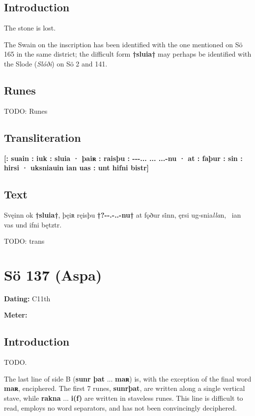\subsection{Introduction}

The stone is lost.

The Swain on the inscription has been identified with the one mentioned on Sö 165 in the same district; the difficult form \textbf{†sluia†} may perhaps be identified with the Slode (\emph{Slóði}) on Sö 2 and 141.

\subsection{Runes}

TODO: Runes%

\subsection{Transliteration}

\textbf{[: suain : iuk : sluia · þaiʀ : raisþu : -{}-{}-... ... ...-nu · at : faþur : sin : hirsi · uksniauin ian uas : unt hifni bistr]}

\subsection{Text}

\bpg\bpa[0]%
\startsub Svęinn ok \textbf{†sluia†}, þęiʀ ręisþu \textbf{†?-{}-{}.-..-nu†} at fǫður si̇nn,\endsub
{}ęrsi \emph{}ug-snia\emph{lla}n, \hld\ ian vas und ifni bętztr.\epa

\bpb TODO: trans\epb\epg

\sectionline\clearpage


\section{Sö 137 (Aspa)}

\begin{flushright}%
\textbf{Dating:} C11th

\textbf{Meter:} \Fornyrdislag
\end{flushright}%

\subsection{Introduction}

TODO.

The last line of side B (\textbf{sunr þat} ... \textbf{maʀ}) is, with the exception of the final word \textbf{maʀ}, enciphered.  The first 7 runes, \textbf{sunrþat}, are written along a single vertical stave, while \textbf{rakna} ... \textbf{i(f)} are written in staveless runes.  This line is difficult to read, employs no word separators, and has not been convincingly deciphered.

